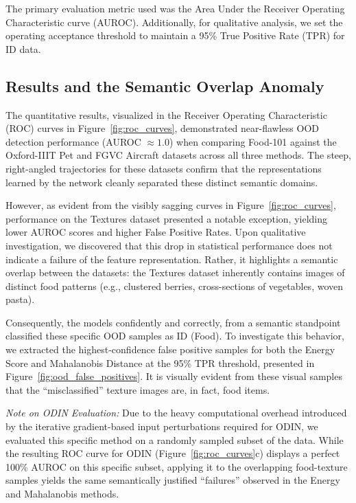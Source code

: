 \documentclass[oneside]{ctuthesis}
\begin{document}
The primary evaluation metric used was the Area Under the Receiver Operating Characteristic curve (AUROC). Additionally, for qualitative analysis, we set the operating acceptance threshold to maintain a 95\% True Positive Rate (TPR) for ID data.

\subsection{Results and the Semantic Overlap Anomaly}
The quantitative results, visualized in the Receiver Operating Characteristic (ROC) curves in Figure~\ref{fig:roc_curves}, demonstrated near-flawless OOD detection performance (AUROC $\approx 1.0$) when comparing Food-101 against the Oxford-IIIT Pet and FGVC Aircraft datasets across all three methods. The steep, right-angled trajectories for these datasets confirm that the representations learned by the network cleanly separated these distinct semantic domains.

However, as evident from the visibly sagging curves in Figure~\ref{fig:roc_curves}, performance on the Textures dataset presented a notable exception, yielding lower AUROC scores and higher False Positive Rates. Upon qualitative investigation, we discovered that this drop in statistical performance does not indicate a failure of the feature representation. Rather, it highlights a semantic overlap between the datasets: the Textures dataset inherently contains images of distinct food patterns (e.g., clustered berries, cross-sections of vegetables, woven pasta). 

Consequently, the models confidently and correctly, from a semantic standpoint classified these specific OOD samples as ID (Food). To investigate this behavior, we extracted the highest-confidence false positive samples for both the Energy Score and Mahalanobis Distance at the 95\% TPR threshold, presented in Figure~\ref{fig:ood_false_positives}. It is visually evident from these visual samples that the ``misclassified'' texture images are, in fact, food items. 

\textit{Note on ODIN Evaluation:} Due to the heavy computational overhead introduced by the iterative gradient-based input perturbations required for ODIN, we evaluated this specific method on a randomly sampled subset of the data. While the resulting ROC curve for ODIN (Figure~\ref{fig:roc_curves}c) displays a perfect 100\% AUROC on this specific subset, applying it to the overlapping food-texture samples yields the same semantically justified ``failures'' observed in the Energy and Mahalanobis methods.
\end{document}
